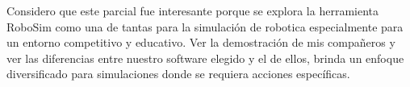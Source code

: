 Considero que este parcial fue interesante porque se explora la herramienta RoboSim como una de tantas para la simulación
de robotica especialmente para un entorno competitivo y educativo. Ver la demostración de mis compañeros y ver las diferencias
entre nuestro software elegido y el de ellos, brinda un enfoque diversificado para simulaciones donde se requiera acciones específicas.
